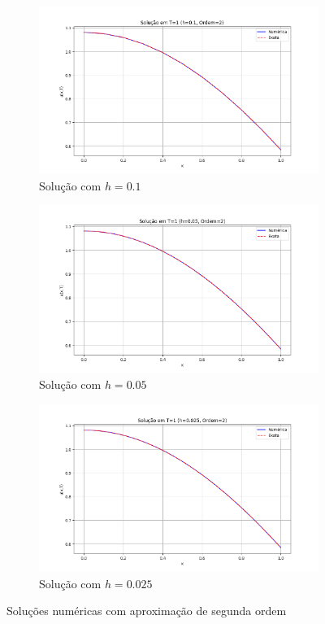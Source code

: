 \documentclass[column,amsmath,amssymb,floatfix]{revtex4}
\begin{document}
\begin{figure}[H]
	\centering
	\begin{subfigure}{0.35\textwidth}
		\includegraphics[width=\textwidth]{img/ex0104.png}
		\caption{Solução com $h=0.1$}
		\label{fig:ex1_4}
	\end{subfigure}
	\begin{subfigure}{0.35\textwidth}
		\includegraphics[width=\textwidth]{img/ex0105.png}
		\caption{Solução com $h=0.05$}
		\label{fig:ex1_5}
	\end{subfigure}
	\begin{subfigure}{0.35\textwidth}
		\includegraphics[width=\textwidth]{img/ex0106.png}
		\caption{Solução com $h=0.025$}
		\label{fig:ex1_6}
	\end{subfigure}
	\caption{Soluções numéricas com aproximação de segunda ordem}
	\label{fig:ex1_ord2}
\end{figure}
\end{document}
